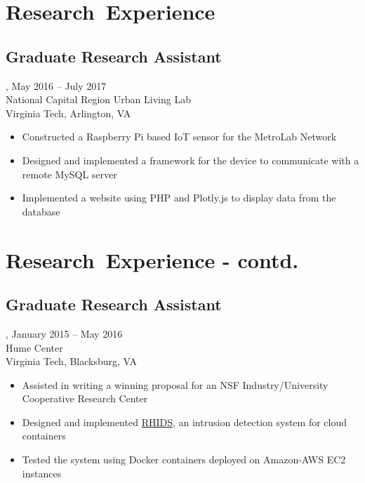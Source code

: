 \section{Research~Experience}
\subsection{Graduate Research Assistant}, May 2016 -- July 2017\\
National Capital Region Urban Living Lab\\
Virginia Tech, Arlington, VA
\begin{itemize}
\item Constructed a Raspberry Pi based IoT sensor for the MetroLab Network
\item Designed and implemented a framework for the device to communicate with a remote MySQL server
\item Implemented a website using PHP and Plotly.js to display data from the database
\end{itemize}
\section{Research~Experience - contd.}
\subsection{Graduate Research Assistant}, January 2015 -- May 2016\\
Hume Center 
\\
Virginia Tech, Blacksburg, VA
\begin{itemize}
\item Assisted in writing a winning proposal for an NSF Industry/University Cooperative Research Center
\item Designed and implemented \href{https://github.com/amrabed/rhids}{RHIDS}, an intrusion detection system for cloud containers
\item Tested the system using Docker containers deployed on Amazon-AWS EC2 instances
\end{itemize}

